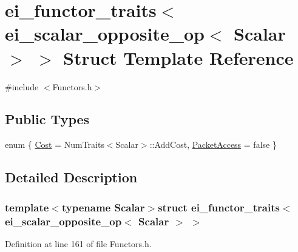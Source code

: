 \hypertarget{structei__functor__traits_3_01ei__scalar__opposite__op_3_01_scalar_01_4_01_4}{\section{ei\-\_\-functor\-\_\-traits$<$ ei\-\_\-scalar\-\_\-opposite\-\_\-op$<$ Scalar $>$ $>$ Struct Template Reference}
\label{structei__functor__traits_3_01ei__scalar__opposite__op_3_01_scalar_01_4_01_4}
}


{\ttfamily \#include $<$Functors.\-h$>$}

\subsection*{Public Types}
\begin{DoxyCompactItemize}
\item 
enum \{ \hyperlink{structei__functor__traits_3_01ei__scalar__opposite__op_3_01_scalar_01_4_01_4_a485e11ada268746986e4b8f5d5ce38f3a6079049af9fa5684e6383ec61039f287}{Cost} = Num\-Traits$<$Scalar$>$\-:\-:Add\-Cost, 
\hyperlink{structei__functor__traits_3_01ei__scalar__opposite__op_3_01_scalar_01_4_01_4_a485e11ada268746986e4b8f5d5ce38f3aaf238cc88574c6040e7f18c919951f0e}{Packet\-Access} = false
 \}
\end{DoxyCompactItemize}


\subsection{Detailed Description}
\subsubsection*{template$<$typename Scalar$>$struct ei\-\_\-functor\-\_\-traits$<$ ei\-\_\-scalar\-\_\-opposite\-\_\-op$<$ Scalar $>$ $>$}



Definition at line 161 of file Functors.\-h.



